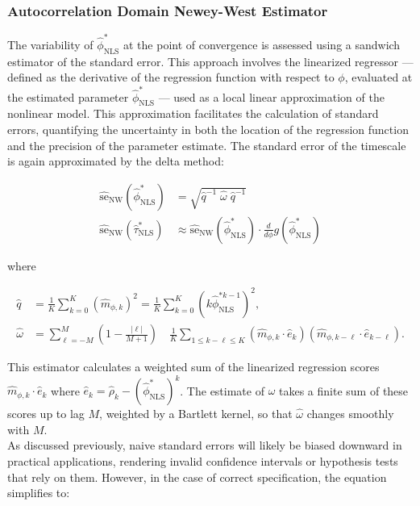 \documentclass[main.tex]{subfiles}
\begin{document}
\subsubsection{Autocorrelation Domain Newey-West Estimator}
The variability of $\hat\phi^*_{\scriptscriptstyle\text{NLS}}$ at the point of convergence is assessed using a sandwich estimator of the standard error. This approach involves the linearized regressor --- defined as the derivative of the regression function with respect to $\phi$, evaluated at the estimated parameter $\hat \phi^*_{\scriptscriptstyle\text{NLS}}$ --- used as a local linear approximation of the nonlinear model. This approximation facilitates the calculation of standard errors, quantifying the uncertainty in both the location of the regression function and the precision of the parameter estimate. The standard error of the timescale is again approximated by the delta method:

\begin{align}
\widehat{\text{se}}_{\text{NW}}(\hat\phi^*_{\scriptscriptstyle\text{NLS}}) &= \sqrt{\hat q^{-1}\;\hat\omega\; \hat q^{-1}}\\
\widehat{\text{se}}_{\text{NW}}(\hat\tau^*_{\scriptscriptstyle\text{NLS}}) &\approx \widehat{\text{se}}_{\text{NW}}(\hat\phi^*_{\scriptscriptstyle\text{NLS}}) \cdot \frac{d}{d\phi} g(\hat\phi^*_{\scriptscriptstyle\text{NLS}})
\end{align}

\noindent where

\begin{align}
    \hat q &= \frac{1}{K} \sum_{k=0}^K (\hat m_{\phi,k})^2 = \frac{1}{K} \sum_{k=0}^K (k \hat\phi_{\scriptscriptstyle\text{NLS}}^{*k-1})^2,\\
    \hat \omega &= \sum_{\ell=-M}^M (1 - \frac{|\ell|}{M+1}) \quad \frac{1}{K} \sum_{1 \le k - \ell \le K} (\hat m_{\phi, k} \cdot \hat e_k) (\hat m_{\phi, k-\ell} \cdot \hat e_{k-\ell}).
\end{align}

This estimator calculates a weighted sum of the linearized regression scores $\hat m_{\phi, k} \cdot \hat e_k$ where $\hat e_k = \hat\rho_k - (\hat\phi^*_{\scriptscriptstyle\text{NLS}})^k$. The estimate of $\hat\omega$ takes a finite sum of these scores up to lag $M$, weighted by a Bartlett kernel, so that $\hat\omega$ changes smoothly with $M$.\\

As discussed previously, naive standard errors will likely be biased downward in practical applications, rendering invalid confidence intervals or hypothesis tests that rely on them. However, in the case of correct specification, the equation simplifies to:
\end{document}
